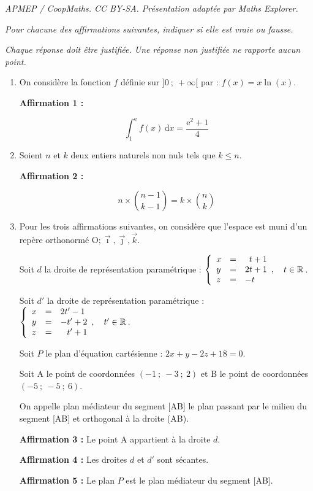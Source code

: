 \documentclass[10pt]{article}
\providecommand{\R}{\mathbb{R}}
\providecommand{\e}{{\mathrm{e}}}
\providecommand{\Oijk}{\(\mathrm{O};\vec{\imath},\vec{\jmath},\vec{k}\)}
\begin{document}
\noindent\textit{APMEP / CoopMaths. CC BY-SA. Présentation adaptée par Maths Explorer.}\par\medskip
\emph{Pour chacune des affirmations suivantes, indiquer si elle est vraie ou fausse.}

	\medskip

	\emph{Chaque réponse doit être justifiée. Une réponse non justifiée ne rapporte aucun point.}

	\bigskip

	\begin{enumerate}[itemsep=8mm]
		\item On considère la fonction $f$ définie sur $]0 ~;~ +\infty [$ par : $f(x)=x \ln(x)$.

		\textbf{Affirmation 1 :}

\[\int_{1}^{\e} f(x) \,\mathrm{d} x=\dfrac{\e^{2}+1}{4}\]

\item Soient $n$ et $k$ deux entiers naturels non nuls tels que $k \leqslant n$.

\textbf{Affirmation 2 :}

\[n \times\binom{ n-1}{k-1}=k \times\binom{ n}{k}\]

		\item Pour les trois affirmations suivantes, on considère que l'espace est muni d'un repère orthonormé \Oijk.

\medskip

Soit $d$ la droite de représentation paramétrique : \quad $\left\{\begin{array}{l c l}
x&=&\phantom{2}t+1 \\
y&=&2 t+1 \\
z&=&-t
\end{array},\quad t \in \R\right.$.

		Soit $d'$ la droite de représentation paramétrique : \quad $\left\{\begin{array}{l c l}
x&=&2t'-1 \\
y&=&-t'+2 \\
z&=&\phantom{-}t'+1
\end{array},\quad t' \in \R\right.$.

\medskip

Soit $P$ le plan d'équation cartésienne : $2 x+y-2 z+18=0$.

Soit A le point de coordonnées $(-1 ~;~-3 ~;~ 2)$ et B le point de coordonnées $(-5 ~;~-5~;~6)$.

On appelle plan médiateur du segment [AB] le plan passant par le milieu du segment [AB] et orthogonal à la droite (AB).

\medskip

\textbf{Affirmation 3 :} Le point A appartient à la droite $d$.

\medskip

\textbf{Affirmation 4 :} Les droites $d$ et $d'$ sont sécantes.

\medskip

		\textbf{Affirmation 5 :} Le plan $P$ est le plan médiateur du segment [AB].
	\end{enumerate}
\end{document}
